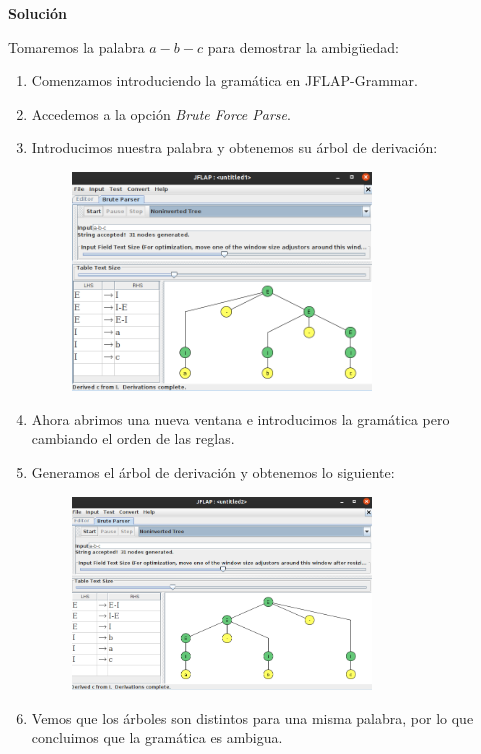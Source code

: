 \documentclass[12pt,spanish]{article}
\newenvironment{solution}{
	\par
	\textbf{Solución}
	\par

}
{
}
\begin{document}
\begin{solution}
Tomaremos la palabra $a-b-c$ para demostrar la ambigüedad:
\begin{enumerate}
	\item Comenzamos introduciendo la gramática en JFLAP-Grammar.
	\item Accedemos a la opción \textit{Brute Force Parse}.
	\item Introducimos nuestra palabra y obtenemos su árbol de derivación:
	\begin{figure}[H]
		\centering
		\includegraphics[width=0.75\textwidth]{p4-1.png}
	\end{figure}
	\item Ahora abrimos una nueva ventana e introducimos la gramática pero cambiando el orden de las reglas.
	\item Generamos el árbol de derivación y obtenemos lo siguiente:
	\begin{figure}[H]
		\centering
		\includegraphics[width=0.75\textwidth]{p4-2.png}
	\end{figure}
	\item Vemos que los árboles son distintos para una misma palabra, por lo que concluimos que la gramática es ambigua.
\end{enumerate}


\end{solution}
\end{document}
